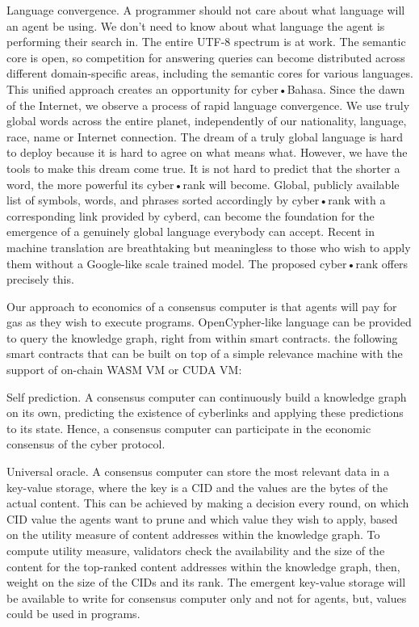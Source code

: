 \documentclass[8pt,oneside]{amsart}
\newcommand{\linkgreen}[2]{\href{#1}{\color{green}{#2}}}
\newcommand{\code}[1]{{\PlayBold #1}}
\begin{document}
\begin{Abstract}
\code{Language convergence}. A programmer should not care about what language will an agent be using. We don't need to know about what language the agent is performing their search in. The entire UTF-8 spectrum is at work. The semantic core is open, so competition for answering queries can become distributed across different domain-specific areas, including the semantic cores for various languages. This unified approach creates an opportunity for cyber•Bahasa. Since the dawn of the Internet, we observe a process of rapid language convergence. We use truly global words across the entire planet, independently of our nationality, language, race, name or Internet connection. The dream of a truly global language is hard to deploy because it is hard to agree on what means what. However, we have the tools to make this dream come true. It is not hard to predict that the shorter a word, the more powerful its cyber•rank will become. Global, publicly available list of symbols, words, and phrases sorted accordingly by cyber•rank with a corresponding link provided by cyberd, can become the foundation for the emergence of a genuinely global language everybody can accept. Recent \linkgreen{https://ipfs.io/ipfs/QmQUWBhDMfPKgFt3NfbxM1VU22oU8CRepUzGPBDtopwap1}{scientific advances} in machine translation are breathtaking but meaningless to those who wish to apply them without a Google-like scale trained model. The proposed cyber•rank offers precisely this.

Our approach to economics of a consensus computer is that agents will pay for gas as they wish to execute programs. OpenCypher-like language can be provided to query the knowledge graph, right from within smart contracts. \linkgreen{https://medium.com/@karpathy/software-2-0-a64152b37c35}{We can envision} the following smart contracts that can be built on top of a simple relevance machine with the support of on-chain WASM VM or CUDA VM:

\code{Self prediction}. A consensus computer can continuously build a knowledge graph on its own, predicting the existence of cyberlinks and applying these predictions to its state. Hence, a consensus computer can participate in the economic consensus of the cyber protocol.

\code{Universal oracle}. A consensus computer can store the most relevant data in a key-value storage, where the key is a CID and the values are the bytes of the actual content. This can be achieved by making a decision every round, on which CID value the agents want to prune and which value they wish to apply, based on the utility measure of content addresses within the knowledge graph. To compute utility measure, validators check the availability and the size of the content for the top-ranked content addresses within the knowledge graph, then, weight on the size of the CIDs and its rank. The emergent key-value storage will be available to write for consensus computer only and not for agents, but, values could be used in programs.


\end{Abstract}
\end{document}
